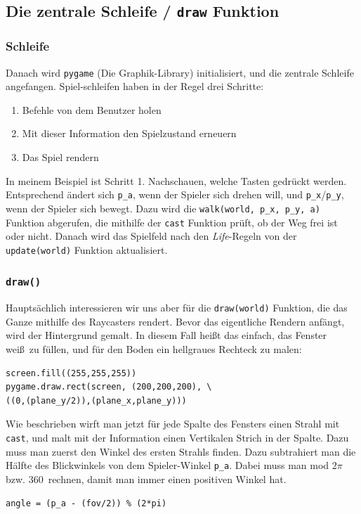\documentclass[a4paper,12pt]{report}
\begin{document}
\subsection{Die zentrale Schleife / \texttt{draw} Funktion}
\subsubsection{Schleife}
Danach wird \texttt{pygame} (Die Graphik-Library) initialisiert, und die zentrale Schleife angefangen. Spiel-schleifen haben in der Regel drei Schritte:
\begin{enumerate}
	\item Befehle von dem Benutzer holen
	\item Mit dieser Information den Spielzustand erneuern
	\item Das Spiel rendern
\end{enumerate}
In meinem Beispiel ist Schritt 1. Nachschauen, welche Tasten gedr\"uckt werden. Entsprechend \"andert sich \texttt{p\_a}, wenn der Spieler sich drehen will, und \texttt{p\_x}/\texttt{p\_y}, wenn der Spieler sich bewegt. Dazu wird die \texttt{walk(world, p\_x, p\_y, a)} Funktion abgerufen, die mithilfe der \texttt{cast} Funktion pr\"uft, ob der Weg frei ist oder nicht. Danach wird das Spielfeld nach den \textit{Life}-Regeln von der \texttt{update(world)} Funktion aktualisiert.

\subsubsection{\texttt{draw()}}
Haupts\"achlich interessieren wir uns aber f\"ur die \texttt{draw(world)} Funktion, die das Ganze mithilfe des Raycasters rendert. Bevor das eigentliche Rendern anf\"angt, wird der Hintergrund gemalt. In diesem Fall hei\ss t das einfach, das Fenster wei\ss\ zu f\"ullen, und f\"ur den Boden ein hellgraues Rechteck zu malen:
\begin{Verbatim}[baselinestretch=1.0, xleftmargin=1cm]
screen.fill((255,255,255))
pygame.draw.rect(screen, (200,200,200), \
((0,(plane_y/2)),(plane_x,plane_y)))
\end{Verbatim}

Wie beschrieben wirft man jetzt f\"ur jede Spalte des Fensters einen Strahl mit \texttt{cast}, und malt mit der Information einen Vertikalen Strich in der Spalte. Dazu muss man zuerst den Winkel des ersten Strahls finden. Dazu subtrahiert man die H\"alfte des Blickwinkels von dem Spieler-Winkel \texttt{p\_a}. Dabei muss man mod $2\pi$ bzw. 360\textdegree\ rechnen, damit man immer einen positiven Winkel hat.
\begin{Verbatim}[baselinestretch=1.0, xleftmargin=1cm]
angle = (p_a - (fov/2)) % (2*pi)
\end{Verbatim}
\end{document}
